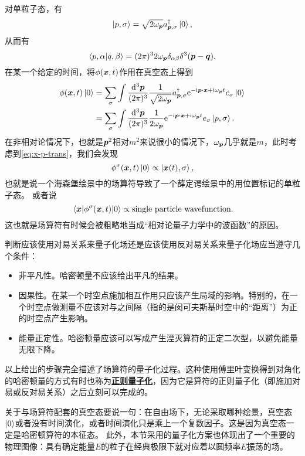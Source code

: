 \documentclass[hyperref, UTF8, a4paper]{ctexart}
\newcommand*{\ii}{\mathrm{i}}
\newcommand*{\ee}{\mathrm{e}}
\newcommand{\concept}[1]{\underline{\textbf{#1}}}
\begin{document}
对单粒子态，有
\[
    \ket{p, \sigma} = \sqrt{2 \omega_{\vb*{p}}} {a}^\dagger_{\vb*{p}, \sigma} \ket{0},
\]
从而有
\begin{equation}
    \braket{p, \alpha}{q, \beta} = (2\pi)^3 2 \omega_{\vb*{p}} \delta_{\alpha \beta} \delta^3(\vb*{p} - \vb*{q}).
\end{equation}
在某一个给定的时间，将${\phi}(\vb*{x}, t)$作用在真空态上得到
\[
    \begin{aligned}
        {\phi}(\vb*{x}, t) \ket{0} &= \sum_\sigma \int \frac{\dd[3]{\vb*{p}}}{(2\pi)^3} \frac{1}{\sqrt{2 \omega_{\vb*{p}}}} {a}^\dagger_{\vb*{p}, \sigma} \ee^{- \ii \vb*{p} \cdot \vb*{x} + \ii \omega_{\vb*{p}} t} e_{\sigma} \ket{0} \\
        &= \sum_\sigma \int \frac{\dd[3]{\vb*{p}}}{(2\pi)^3} \frac{1}{2 \omega_{\vb*{p}}} \ee^{- \ii \vb*{p} \cdot \vb*{x} + \ii \omega_{\vb*{p}} t} e_{\sigma} \ket{p, \sigma}.
    \end{aligned}
\]
在非相对论情况下，也就是$\vb*{p}^2$相对$m^2$来说很小的情况下，$\omega_{\vb*{p}}$几乎就是$m$，此时考虑到\eqref{eq:x-p-trans}，我们会发现
\[
    {\phi}^\sigma (\vb*{x}, t) \ket{0} \propto \ket{\vb*{x}(t), \sigma},
\]
也就是说一个海森堡绘景中的场算符导致了一个薛定谔绘景中的用位置标记的单粒子态。
或者说
\[
    \mel{\vb*{x}}{{\phi}^\sigma (\vb*{x}, t)}{0} \propto \text{single particle wavefunction}.
\]
这也就是场算符有时候会被粗略地当成“相对论量子力学中的波函数”的原因。

判断应该使用对易关系来量子化场还是应该使用反对易关系来量子化场应当遵守几个条件：
\begin{itemize}
    \item 非平凡性。哈密顿量不应该给出平凡的结果。
    \item 因果性。在某一个时空点施加相互作用只应该产生局域的影响。特别的，在一个时空点做测量不应该对与之间隔（指的是闵可夫斯基时空中的“距离”）为正的时空点产生影响。
    \item 能量正定性。哈密顿量应该可以写成产生湮灭算符的正定二次型，以避免能量无限下降。
\end{itemize}

以上给出的步骤完全描述了场算符的量子化过程。这种使用傅里叶变换得到对角化的哈密顿量的方式有时也称为\concept{正则量子化}，因为它是算符的正则量子化（即施加对易或反对易关系）之后立刻可以完成的。

关于与场算符配套的真空态要说一句：在自由场下，无论采取哪种绘景，真空态$\ket{0}$或者没有时间演化，或者时间演化只是乘上一个复数因子。这是因为真空态一定是哈密顿算符的本征态。
此外，本节采用的量子化方案也体现出了一个重要的物理图像：具有确定能量$E$的粒子在经典极限下就对应着以圆频率$E$振荡的场。
\end{document}
